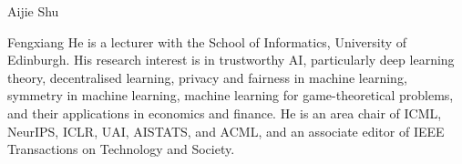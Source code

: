 \documentclass[10pt,journal,compsoc,onecolumn]{IEEEtran}
\begin{document}








 







\begin{IEEEbiography}%
{Aijie Shu}

\end{IEEEbiography}

\begin{IEEEbiography}%
{Fengxiang He} is a lecturer with the School of Informatics, University of Edinburgh. His research interest is in trustworthy AI, particularly deep learning theory, decentralised learning, privacy and fairness in machine learning, symmetry in machine learning, machine learning for game-theoretical problems, and their applications in economics and finance. He is an area chair of ICML, NeurIPS, ICLR, UAI, AISTATS, and ACML, and an associate editor of IEEE Transactions on Technology and Society.

\end{IEEEbiography}


\vfill

\appendices
\end{document}
